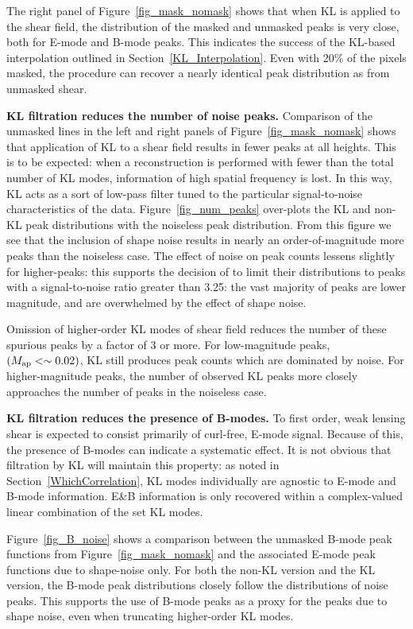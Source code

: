 The right panel of Figure~\ref{fig_mask_nomask} shows that when 
KL is applied to the shear field, the distribution of the masked and
unmasked peaks is very close, both for E-mode and B-mode peaks.
This indicates the success of the KL-based interpolation outlined in
Section~\ref{KL_Interpolation}.  Even with 20\% of the pixels masked,
the procedure can recover a nearly identical peak distribution as 
from unmasked shear.

\textbf{KL filtration reduces the number of noise peaks.}
Comparison of the unmasked lines in the left and right panels of 
Figure~\ref{fig_mask_nomask} shows that application of KL to a shear
field results in fewer peaks at all heights.  This is to be expected:
when a reconstruction is performed with fewer than the total number
of KL modes, information of high spatial frequency is lost.  In this
way, KL acts as a sort of low-pass filter tuned to the particular
signal-to-noise characteristics of the data.  Figure~\ref{fig_num_peaks}
over-plots the KL and non-KL peak distributions with the noiseless
peak distribution.  From this figure we see that the inclusion of
shape noise results in nearly an order-of-magnitude more peaks than 
the noiseless case.  The effect of noise on peak counts lessens slightly 
for higher-\Map peaks: this supports the decision of \citet{Dietrich10} 
to limit their distributions to peaks with a signal-to-noise 
ratio greater than 3.25: the vast majority of peaks are lower 
magnitude, and are overwhelmed by the effect of shape noise.

Omission of higher-order KL modes of shear field reduces the number of
these spurious peaks by a factor of 3 or more.  For low-magnitude peaks,
$(M_{\rm ap}<\sim 0.02)$, KL still produces peak counts which are 
dominated by noise. For higher-magnitude peaks, the number of observed 
KL peaks more closely approaches the number of peaks in the noiseless case.

\textbf{KL filtration reduces the presence of B-modes.}
To first order, weak lensing shear is expected to consist primarily of
curl-free, E-mode signal.  Because of this, the presence of B-modes can
indicate a systematic effect.  It is not obvious that filtration by KL
will maintain this property: as noted in Section~\ref{WhichCorrelation},
KL modes individually are agnostic to E-mode and B-mode information.  
E\&B information is only recovered within a 
complex-valued linear combination of the set KL modes.

Figure~\ref{fig_B_noise} shows a comparison between the unmasked
B-mode peak functions from Figure~\ref{fig_mask_nomask} and the associated
E-mode peak functions due to shape-noise only.  For both the non-KL version
and the KL version, the B-mode peak distributions closely follow the
distributions of noise peaks.  This supports the use of B-mode peaks as
a proxy for the peaks due to shape noise, even when truncating higher-order
KL modes.

